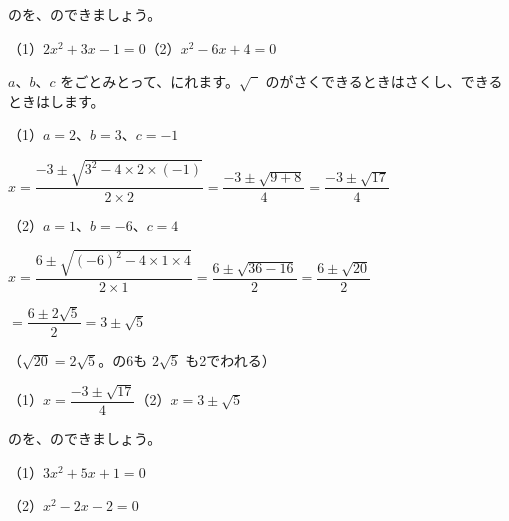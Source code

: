 \begin{reidai}[\R{解}{かい}の\R{公式}{こう|しき}で\R{解}{と}く]
のを、のできましょう。\par（1）\nobreak $2x^2+3x-1=0$\quad（2）\nobreak $x^2-6x+4=0$\par
\kangaekata $a$、$b$、$c$ をごとみとって、にれます。$\sqrt{\phantom{2}}$ のがさくできるときはさくし、できるときはします。\par
\shiki（1）\nobreak $a=2$、$b=3$、$c=-1$\par
\addvspace{3pt}\hspace*{4.3\zw}$x=\dfrac{-3\pm\sqrt{3^2-4\times2\times(-1)}}{2\times2}=\dfrac{-3\pm\sqrt{9+8}}{4}=\dfrac{-3\pm\sqrt{17}}{4}$\par\vspace{2pt}
\hspace*{2.6\zw}（2）\nobreak $a=1$、$b=-6$、$c=4$\par
\addvspace{3pt}\hspace*{4.3\zw}$x=\dfrac{6\pm\sqrt{(-6)^2-4\times1\times4}}{2\times1}=\dfrac{6\pm\sqrt{36-16}}{2}=\dfrac{6\pm\sqrt{20}}{2}$\par\addvspace{3pt}
\hspace*{5.3\zw}$=\dfrac{6\pm2\sqrt{5}}{2}=3\pm\sqrt{5}$\par\vspace{2pt}
\hspace*{4.3\zw}（$\sqrt{20}=2\sqrt{5}$。の6も $2\sqrt{5}$ も2でわれる）\par
\kotae（1）\nobreak $x=\dfrac{-3\pm\sqrt{17}}{4}$\quad（2）\nobreak $x=3\pm\sqrt{5}$
\end{reidai}

\begin{jibun}
のを、のできましょう。\par
（1）\nobreak $3x^2+5x+1=0$\par
（2）\nobreak $x^2-2x-2=0$
\end{jibun}

